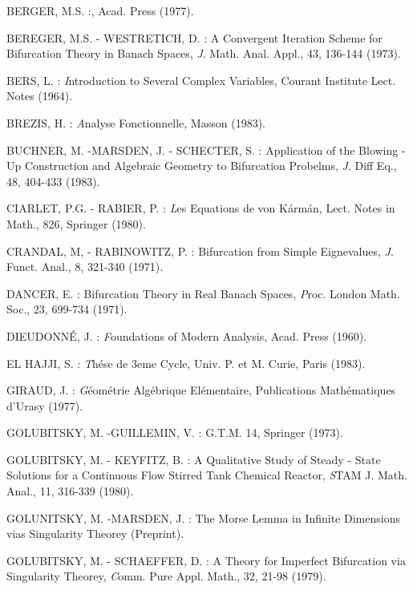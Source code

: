 \begin{thebibliography}{99}
 {BERGER, M.S. :},   Acad. Press (1977).

 {BEREGER, M.S. - WESTRETICH, D. :} A Convergent Iteration
  Scheme for Bifurcation Theory in Banach Spaces, {\textit
    J. Math. Anal. Appl.,} 43, 136-144 (1973).

 {BERS, L. :} {\textit Introduction to Several Complex
  Variables,} Courant Institute Lect. Notes (1964).

 {BREZIS, H. :} {\textit Analyse Fonctionnelle,}  Masson
  (1983).

 {BUCHNER, M. -MARSDEN, J. - SCHECTER, S. :} Application of
  the Blowing - Up Construction and Algebraic Geometry to Bifurcation
  Probelms, {\textit J. Diff Eq.,} 48, 404-433 (1983).

 {CIARLET, P.G. - RABIER, P. :} {\textit Les Equations de
  von K\'{a}rm\'{a}n}, Lect. Notes in Math., 826, Springer (1980).

 {CRANDAL, M, - RABINOWITZ, P. :} Bifurcation from Simple
Eignevalues, {\textit J. Funct. Anal.,} 8, 321-340 (1971).

 {DANCER, E. :} Bifurcation Theory in Real Banach Spaces,
        {\textit Proc. London Math. Soc.,} 23, 699-734 (1971).

 {DIEUDONN\'{E}, J. :} {\textit Foundations of Modern
  Analysis}, Acad. Press (1960).

 {EL HAJJI, S. :} {\textit Th\'{e}se de 3eme Cycle},
Univ. P. et M. Curie, Paris (1983).

 {GIRAUD, J. :} {\textit G\'{e}om\'{e}trie Alg\'{e}brique
  El\'{e}mentaire,} Publications Math\'{e}matiques d'Urasy (1977).

 {GOLUBITSKY, M. -GUILLEMIN, V. :} G.T.M. 14, Springer (1973).

 {GOLUBITSKY, M. - KEYFITZ, B. :} A Qualitative Study of
Steady - State Solutions for a Continuous Flow Stirred Tank Chemical
Reactor,  {\textit STAM J. Math. Anal}., 11, 316-339 (1980).

 {GOLUNITSKY, M. -MARSDEN, J. :} The Morse Lemma in
Infinite Dimensions vias Singularity Theorey (Preprint).

 {GOLUBITSKY, M. - SCHAEFFER, D. :} A Theory for Imperfect
Bifurcation via Singularity Theorey, {\textit Comm. Pure Appl. Math.,}
32, 21-98 (1979).


\end{thebibliography}
